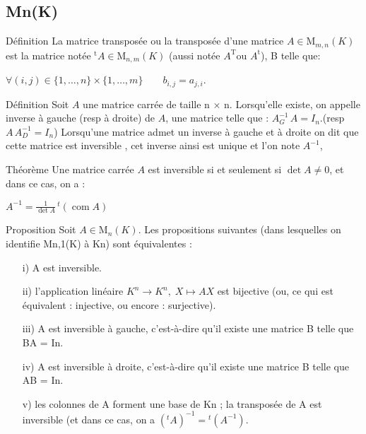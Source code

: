 \documentclass{book}
\begin{document}
\subsection{Mn(K)}
\begin{Définition}[]{Définition}{}
    La matrice transposée ou la transposée d'une matrice ${\displaystyle A\in \mathrm {M} _{m,n}(K)}$ est la matrice notée ${\displaystyle ^{\operatorname {t} }\!A\in \mathrm {M} _{n,m}(K)}$ (aussi  notée ${\displaystyle A^{\operatorname {T} }} $ou ${\displaystyle A^{\operatorname {t} }}$), B telle que:
\begin{center}
${\displaystyle \forall (i,j)\in \{1,\ldots ,n\}\times \{1,\ldots ,m\}\qquad b_{i,j}=a_{j,i}}$.
\end{center}
\end{Définition}
\begin{Définition}[]{Définition}{}
    Soit ${\displaystyle A}$ une matrice carrée de taille n × n. Lorsqu'elle existe, on appelle inverse à gauche (resp à droite) de ${\displaystyle A}$, une matrice telle que : ${\displaystyle A_{G}^{-1}\,A= {I} _{n}}$.(resp ${\displaystyle A\,A_{D}^{-1}= {I} _{n}}$)
    Lorsqu'une matrice admet un inverse à gauche et à droite on dit que cette matrice est inversible , cet inverse ainsi est unique et l'on note ${\displaystyle A^{-1}}$, 
\end{Définition}
\begin{Théorème}[]{Théorème}{}
    Une matrice carrée ${\displaystyle A}$ est inversible si et seulement si ${\displaystyle \det A\neq 0}$, et dans ce cas, on a :
\begin{center}
${\displaystyle A^{-1}={\frac {1}{\det A}}\,{}^{t}\!\left(\operatorname {com} A\right)}$
\end{center}
\end{Théorème}
\begin{Propriété}[]{Proposition}{}
    Soit ${\displaystyle A\in \mathrm {M} _{n}(K)}$. Les propositions suivantes (dans lesquelles on identifie Mn,1(K) à Kn) sont équivalentes :
\begin{itemize}
    \item[i)] A est inversible.
    \item[ii)]l'application linéaire ${\displaystyle K^{n}\to K^{n},\;X\mapsto AX}$ est bijective (ou, ce qui est équivalent : injective, ou encore : surjective).
    \item[iii)]A est inversible à gauche, c'est-à-dire qu'il existe une matrice B telle que BA = In.
    \item[iv)]A est inversible à droite, c'est-à-dire qu'il existe une matrice B telle que AB = In.
    \item[v)]les colonnes de A forment une base de Kn ;
    la transposée de A est inversible (et dans ce cas, on a ${\displaystyle (^{t}\!A)^{-1}={}^{t}\!(A^{-1})}$.
\end{itemize}


\end{Propriété}
\end{document}
